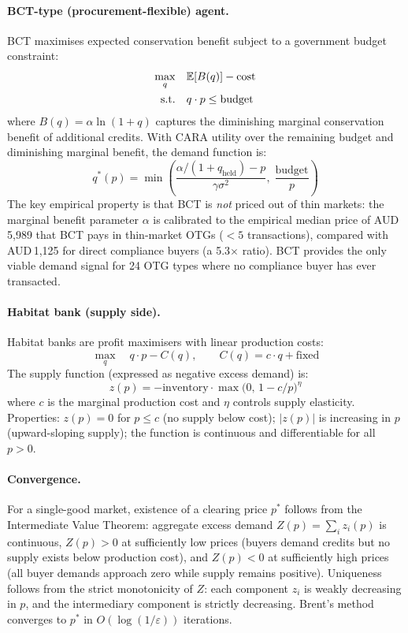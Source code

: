 \documentclass[pdflatex,sn-nature,oneside]{sn-jnl}
\begin{document}
\paragraph{BCT-type (procurement-flexible) agent.}
BCT maximises expected conservation benefit subject to a government budget constraint:
\begin{align}
    \max_{q} \quad & \mathbb{E}[B(q)] - \text{cost} \notag \\
    \text{s.t.} \quad & q \cdot p \leq \text{budget}
\end{align}
where $B(q) = \alpha \ln(1 + q)$ captures the diminishing marginal conservation benefit of additional credits. With CARA utility over the remaining budget and diminishing marginal benefit, the demand function is:
\begin{equation}
    q^{*}(p) = \min\!\left(\frac{\alpha/(1 + q_{\text{held}}) - p}{\gamma \sigma^2},\; \frac{\text{budget}}{p}\right)
\end{equation}
The key empirical property is that BCT is \emph{not} priced out of thin markets: the marginal benefit parameter $\alpha$ is calibrated to the empirical median price of AUD\,5,989 that BCT pays in thin-market OTGs ($<5$ transactions), compared with AUD\,1,125 for direct compliance buyers (a 5.3$\times$ ratio). BCT provides the only viable demand signal for 24 OTG types where no compliance buyer has ever transacted.

\paragraph{Habitat bank (supply side).}
Habitat banks are profit maximisers with linear production costs:
\begin{equation}
    \max_{q} \quad q \cdot p - C(q), \qquad C(q) = c \cdot q + \text{fixed}
\end{equation}
The supply function (expressed as negative excess demand) is:
\begin{equation}
    z(p) = -\text{inventory} \cdot \max\!\bigl(0,\, 1 - c/p\bigr)^{\eta}
\end{equation}
where $c$ is the marginal production cost and $\eta$ controls supply elasticity. Properties: $z(p) = 0$ for $p \leq c$ (no supply below cost); $|z(p)|$ is increasing in $p$ (upward-sloping supply); the function is continuous and differentiable for all $p > 0$.

\paragraph{Convergence.}
For a single-good market, existence of a clearing price $p^*$ follows from the Intermediate Value Theorem: aggregate excess demand $Z(p) = \sum_i z_i(p)$ is continuous, $Z(p) > 0$ at sufficiently low prices (buyers demand credits but no supply exists below production cost), and $Z(p) < 0$ at sufficiently high prices (all buyer demands approach zero while supply remains positive). Uniqueness follows from the strict monotonicity of $Z$: each component $z_i$ is weakly decreasing in $p$, and the intermediary component is strictly decreasing. Brent's method converges to $p^*$ in $O(\log(1/\varepsilon))$ iterations.
\end{document}
